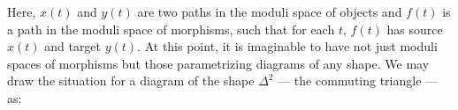 \documentclass[11pt]{amsart}
\begin{document}
\noindent Here, $x(t)$ and $y(t)$ are two paths in the moduli space of objects
and $f(t)$ is a path in the moduli space of morphisms, such that
for each $t$, $f(t)$ has source $x(t)$ and target $y(t)$. At this point,
it is imaginable to have not just moduli spaces of morphisms but those
parametrizing diagrams of any shape. We may draw the situation for a diagram
of the shape $\Delta^2$ --- the commuting triangle --- as:
\begin{figure}[H]
\centering


\begin{tikzpicture}[x=0.75pt,y=0.75pt,yscale=-1,xscale=1]


\end{tikzpicture}
\end{figure}
\end{document}
